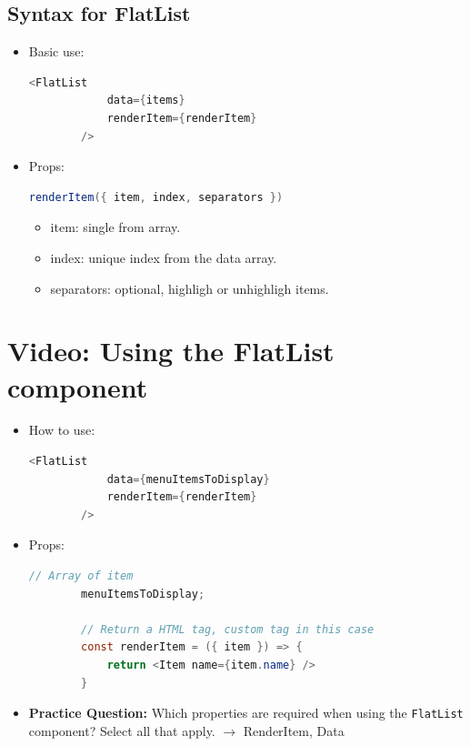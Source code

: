 \subsection{Syntax for FlatList}
\begin{itemize}
    \item Basic use: 
    \begin{lstlisting}[language=Java, numbers=none]
        <FlatList 
            data={items}
            renderItem={renderItem}
        />
    \end{lstlisting}
    \item Props: 
    \begin{lstlisting}[language=Java, numbers=none]
        renderItem({ item, index, separators })
    \end{lstlisting}
    \begin{itemize}
        \item item: single from array.
        \item index: unique index from the data array.
        \item separators: optional, highligh or unhighligh items.
    \end{itemize}
\end{itemize}

\section{Video: Using the FlatList component}
\begin{itemize}
    \item How to use:
    \begin{lstlisting}[language=Java, numbers=none]
        <FlatList
            data={menuItemsToDisplay}
            renderItem={renderItem}
        />
    \end{lstlisting} 
    \item Props:
    \begin{lstlisting}[language=Java, numbers=none]
        // Array of item
        menuItemsToDisplay;

        // Return a HTML tag, custom tag in this case
        const renderItem = ({ item }) => {
            return <Item name={item.name} />
        }
    \end{lstlisting} 

    \item \textbf{Practice Question:} Which properties are required when using the \texttt{FlatList} component? Select all that apply.
    $\rightarrow$ RenderItem, Data
\end{itemize}

